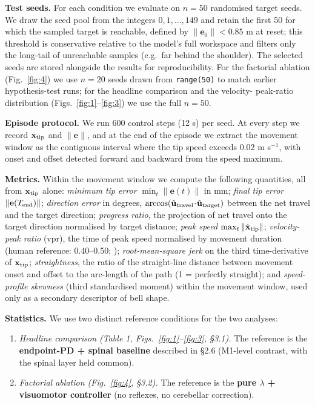 \documentclass[sn-basic]{sn-jnl}
\begin{document}
\textbf{Test seeds.} For each condition we evaluate on \(n = 50\)
randomised target seeds. We draw the seed pool from the integers
\(0,1,\dots, 149\) and retain the first 50 for which the sampled target
is reachable, defined by \(\|\mathbf{e}_{0}\| < 0.85\) m at reset; this
threshold is conservative relative to the model's full workspace and
filters only the long-tail of unreachable samples (e.g.~far behind the
shoulder). The selected seeds are stored alongside the results for
reproducibility. For the factorial ablation (Fig.~\ref{fig:4}) we use \(n = 20\)
seeds drawn from \texttt{range(50)} to match earlier hypothesis-test
runs; for the headline comparison and the velocity- peak-ratio
distribution (Figs.~\ref{fig:1}--\ref{fig:3}) we use the full \(n = 50\).

\textbf{Episode protocol.} We run 600 control steps (12 s) per seed. At
every step we record \(\mathbf{x}_{\rm tip}\) and \(\|\mathbf{e}\|\),
and at the end of the episode we extract the movement window as the
contiguous interval where the tip speed exceeds 0.02 m s\(^{-1}\), with
onset and offset detected forward and backward from the speed maximum.

\textbf{Metrics.} Within the movement window we compute the following
quantities, all from \(\mathbf{x}_{\rm tip}\) alone: \emph{minimum tip
error} \(\min_{t}\|\mathbf{e}(t)\|\) in mm; \emph{final tip error}
\(\|\mathbf{e}(T_{\rm end})\|\); \emph{direction error} in degrees,
\(\arccos(\hat{\mathbf{u}}_{\rm travel}\!\cdot\!\hat{\mathbf{u}}_{\rm target})\)
between the net travel and the target direction; \emph{progress ratio},
the projection of net travel onto the target direction normalised by
target distance; \emph{peak speed}
\(\max_{t}\|\dot{\mathbf{x}}_{\rm tip}\|\); \emph{velocity-peak ratio}
(vpr), the time of peak speed normalised by movement duration (human
reference: 0.40--0.50; \citealt{morasso1981, flashhogan1985});
\emph{root-mean-square jerk} on the third time-derivative of
\(\mathbf{x}_{\rm tip}\); \emph{straightness}, the ratio of the
straight-line distance between movement onset and offset to the
arc-length of the path (1 = perfectly straight); and \emph{speed-profile
skewness} (third standardised moment) within the movement window, used
only as a secondary descriptor of bell shape.

\textbf{Statistics.} We use two distinct reference conditions for the
two analyses:

\begin{enumerate}
\def\labelenumi{\arabic{enumi}.}
\item
  \emph{Headline comparison (Table 1, Figs.~\ref{fig:1}--\ref{fig:3}, §3.1).} The reference
  is the \textbf{endpoint-PD + spinal baseline} described in §2.6
  (M1-level contrast, with the spinal layer held common).
\item
  \emph{Factorial ablation (Fig.~\ref{fig:4}, §3.2).} The reference is the
  \textbf{pure $\lambda$ + visuomotor controller} (no reflexes, no cerebellar
  correction).
\end{enumerate}
\end{document}
